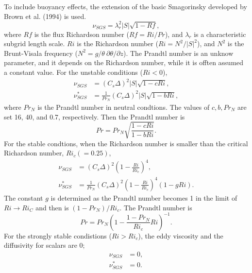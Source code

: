 To include buoyancy effects,
the extension of the basic Smagorinsky developed by Brown et al. (1994)
is used.
\begin{equation}
  \nu_{SGS} = \lambda_r^2 |S| \sqrt{1-Rf},
\end{equation}
where $Rf$ is the flux Richardson number ($Rf = Ri/Pr$),
and $\lambda_r$ is a characteristic subgrid length scale.
$Ri$ is the Richardson number ($Ri = N^2/|S|^2$),
and $N^2$ is the Brunt-Visala frequency ($N^2 = g/\theta\:\partial\theta/\partial z$).
The Prandtl number is an unknow parameter,
and it depends on the Richardson number,
while it is offten assumed a constant value.
For the unstable conditions ($Ri < 0$),
\begin{align}
  \nu_{SGS} &= \left(C_s\Delta\right)^2 |S| \sqrt{1 - c Ri}, \\
  \nu^*_{SGS} &= \frac{1}{Pr_N} \left(C_s\Delta\right)^2 |S| \sqrt{1 - b Ri},
\end{align}
where $Pr_N$ is the Prandtl number in neutral condtions.
The values of $c, b, Pr_N$ are set 16, 40, and 0.7, respectively.
Then the Prandtl number is
\begin{equation}
  Pr = Pr_N \sqrt{\frac{1-c Ri}{1-b Ri}}.
\end{equation}
For the stable condtions,
when the Richardson number is smaller than the critical Richardson number, $Ri_c (=0.25)$,
\begin{align}
  \nu_{SGS} &= \left(C_s\Delta\right)^2 \left(1-\frac{Ri}{Ri_c}\right)^4, \\
  \nu^*_{SGS} &= \frac{1}{Pr_N}\left(C_s\Delta\right)^2 \left(1-\frac{Ri}{Ri_c}\right)^4\left(1-g Ri\right).
\end{align}
The constant $g$ is determined as the Prandtl number becomes 1
in the limit of $Ri \to Ri_C$ and then is $(1-Pr_N)/Ri_c$.
The Prandtl number is
\begin{equation}
  Pr = Pr_N \left(1-\frac{1-Pr_N}{Ri_c}Ri\right)^{-1}.
\end{equation}
For the strongly stable condistions ($Ri > Ri_c$),
the eddy viscosity and the diffusivity for scalars are 0;
\begin{align}
  \nu_{SGS} &= 0, \\
  \nu^*_{SGS} &= 0.
\end{align}

%
